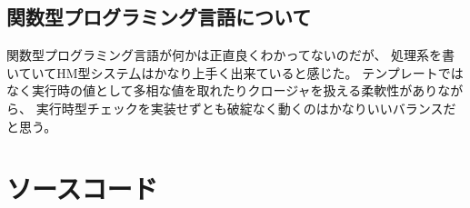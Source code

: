 \documentclass[report]{jlreq}
\begin{document}
    \section{関数型プログラミング言語について}
      関数型プログラミング言語が何かは正直良くわかってないのだが、
      処理系を書いていてHM型システ厶はかなり上手く出来ていると感じた。
      テンプレートではなく実行時の値として多相な値を取れたりクロージャを扱える柔軟性がありながら、
      実行時型チェックを実装せずとも破綻なく動くのはかなりいいバランスだと思う。
  \chapter{ソースコード}
    
    
    
    
  
  
\end{document}

